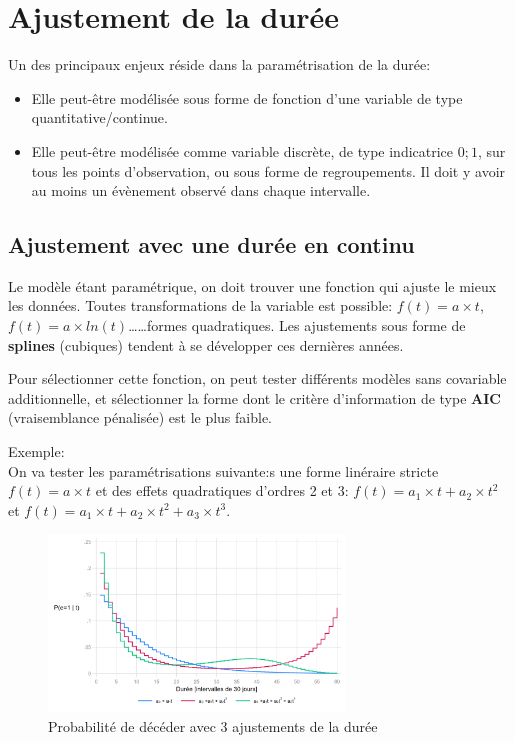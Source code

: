\documentclass[
  12pt,
  letterpaper,
  DIV=11,
  numbers=noendperiod,
  onepage,
  openany]{scrreprt}
\providecommand{\tightlist}{%
  \setlength{\itemsep}{0pt}\setlength{\parskip}{0pt}}\usepackage{longtable,booktabs,array}
\begin{document}
\hypertarget{ajustement-de-la-duruxe9e}{%
\section{Ajustement de la durée}\label{ajustement-de-la-duruxe9e}}

Un des principaux enjeux réside dans la paramétrisation de la durée:

\begin{itemize}
\tightlist
\item
  Elle peut-être modélisée sous forme de fonction d'une variable de type
  quantitative/continue.
\item
  Elle peut-être modélisée comme variable discrète, de type indicatrice
  \({0;1}\), sur tous les points d'observation, ou sous forme de
  regroupements. Il doit y avoir au moins un évènement observé dans
  chaque intervalle.
\end{itemize}

\hypertarget{ajustement-avec-une-duruxe9e-en-continu}{%
\subsection{Ajustement avec une durée en
continu}\label{ajustement-avec-une-duruxe9e-en-continu}}

Le modèle étant paramétrique, on doit trouver une fonction qui ajuste le
mieux les données. Toutes transformations de la variable est possible:
\(f(t)=a\times t\), \(f(t)=a\times ln(t)\)\ldots\ldots formes
quadratiques. Les ajustements sous forme de \textbf{splines} (cubiques)
tendent à se développer ces dernières années.

Pour sélectionner cette fonction, on peut tester différents modèles sans
covariable additionnelle, et sélectionner la forme dont le critère
d'information de type \textbf{AIC} (vraisemblance pénalisée) est le plus
faible.

Exemple:\\
On va tester les paramétrisations suivante:s une forme linéraire stricte
\(f(t)=a\times t\) et des effets quadratiques d'ordres 2 et 3:
\(f(t)=a_1\times t + a_2\times t^{2}\) et
\(f(t)=a_1\times t + a_2\times t^{2} + a_3\times t^{3}\).

\begin{figure}

\caption{Probabilité de décéder avec 3 ajustements de la durée}

{\centering \includegraphics[width=0.7\textwidth,height=\textheight]{images/Image11.png}

}

\end{figure}
\end{document}
